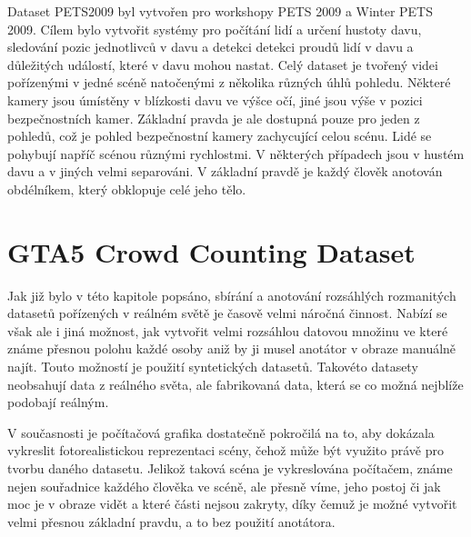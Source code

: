 Dataset PETS2009 byl vytvořen pro workshopy PETS 2009 a Winter PETS 2009.
Cílem bylo vytvořit systémy pro počítání lidí a určení hustoty davu, sledování pozic jednotlivců v davu a detekci detekci proudů lidí v davu a důležitých událostí, které v davu mohou nastat.
Celý dataset je tvořený videi pořízenými v jedné scéně natočenými z několika různých úhlů pohledu.
Některé kamery jsou úmístěny v blízkosti davu ve výšce očí, jiné jsou výše v pozici bezpečnostních kamer.
Základní pravda je ale dostupná pouze pro jeden z pohledů, což je pohled bezpečnostní kamery zachycující celou scénu.
Lidé se pohybují napříč scénou různými rychlostmi. V některých případech jsou v hustém davu a v jiných velmi separováni. V základní pravdě je každý člověk anotován obdélníkem, který obklopuje celé jeho tělo.





\section{GTA5 Crowd Counting Dataset}
Jak již bylo v této kapitole popsáno, sbírání a anotování rozsáhlých rozmanitých datasetů pořízených v reálném světě je časově velmi náročná činnost.
Nabízí se však ale i jiná možnost, jak vytvořit velmi rozsáhlou datovou množinu ve které známe přesnou polohu každé osoby aniž by ji musel anotátor v obraze manuálně najít.
Touto možností je použití syntetických datasetů.
Takovéto datasety neobsahují data z reálného světa, ale fabrikovaná data, která se co možná nejblíže podobají reálným.

V současnosti je počítačová grafika dostatečně pokročilá na to, aby dokázala vykreslit fotorealistickou reprezentaci scény, čehož může být využito právě pro tvorbu daného datasetu.
Jelikož taková scéna je vykreslována počítačem, známe nejen souřadnice každého člověka ve scéně, ale přesně víme, jeho postoj či jak moc je v obraze vidět a které části nejsou zakryty, díky čemuž je možné vytvořit velmi přesnou základní pravdu, a to bez použití anotátora.


